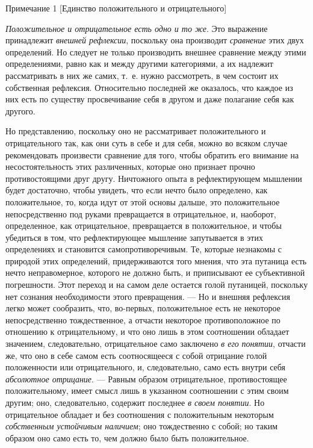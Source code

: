 {\centering
Примечание 1
[Единство положительного и отрицательного]
\par}

{\em Положительное и отрицательное есть одно и то же}.
Это выражение принадлежит {\em внешней рефлексии},
поскольку она производит {\em сравнение} этих двух
определений. Но следует не только производить внешнее сравнение между этими
определениями, равно как и между другими категориями, а их надлежит
рассматривать в них же самих, т.~е. нужно рассмотреть, в чем состоит их
собственная рефлексия. Относительно последней же оказалось, что каждое из
них есть по существу просвечивание себя в другом и даже полагание себя как
другого.

Но представлению, поскольку оно не рассматривает положительного и
отрицательного так, как они суть в себе и для себя, можно во всяком случае
рекомендовать произвести сравнение для того, чтобы обратить его внимание на
несостоятельность этих различенных, которые оно признает прочно
противостоящими друг другу. Ничтожного опыта в рефлектирующем мышлении
будет достаточно, чтобы увидеть, что если нечто было определено, как
положительное, то, когда идут от этой основы дальше, это положительное
непосредственно под руками превращается в отрицательное, и, наоборот,
определенное, как отрицательное, превращается в положительное, и чтобы
убедиться в том, что рефлектирующее мышление запутывается в этих
определениях и становится самопротиворечивым. Те, которые незнакомы с
природой этих определений, придерживаются того мнения, что эта путаница
есть нечто неправомерное, которого не должно быть, и приписывают ее
субъективной погрешности. Этот переход и на самом деле остается голой
путаницей, поскольку нет сознания необходимости этого превращения. — Но и
внешняя рефлексия легко может сообразить, что, во-первых, положительное
есть не некоторое непосредственно тождественное, а отчасти некоторое
противоположное по отношению к отрицательному, и что оно лишь в этом
соотношении обладает значением, следовательно, отрицательное само заключено
{\em в его }{\em понятии}, отчасти
же, что оно в себе самом есть соотносящееся с собой отрицание голой
положенности или отрицательного, и, следовательно, само есть внутри себя
{\em абсолютное отрицание}. — Равным образом
отрицательное, противостоящее положительному, имеет смысл лишь в указанном
соотношении с этим своим другим; оно, следовательно, содержит последнее
{\em в своем понятии}. Но отрицательное обладает и без
соотношения с положительным некоторым {\em собственным
устойчивым наличием}; оно тождественно с собой; но таким образом оно само
есть то, чем должно было быть положительное.

